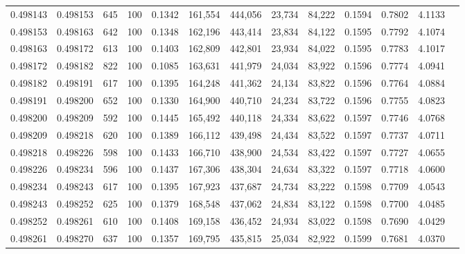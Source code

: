 \begin{tabular}{rrrrrrrrrrrrr}
0.498143 & 0.498153 &   645 & 100 &                                     0.1342 & 161,554 & 444,056 &  23,734 &  84,222 & 0.1594 & 0.7802 & 4.1133 \\
0.498153 & 0.498163 &   642 & 100 &                                     0.1348 & 162,196 & 443,414 &  23,834 &  84,122 & 0.1595 & 0.7792 & 4.1074 \\
0.498163 & 0.498172 &   613 & 100 &                                     0.1403 & 162,809 & 442,801 &  23,934 &  84,022 & 0.1595 & 0.7783 & 4.1017 \\
0.498172 & 0.498182 &   822 & 100 &                                     0.1085 & 163,631 & 441,979 &  24,034 &  83,922 & 0.1596 & 0.7774 & 4.0941 \\
0.498182 & 0.498191 &   617 & 100 &                                     0.1395 & 164,248 & 441,362 &  24,134 &  83,822 & 0.1596 & 0.7764 & 4.0884 \\
0.498191 & 0.498200 &   652 & 100 &                                     0.1330 & 164,900 & 440,710 &  24,234 &  83,722 & 0.1596 & 0.7755 & 4.0823 \\
0.498200 & 0.498209 &   592 & 100 &                                     0.1445 & 165,492 & 440,118 &  24,334 &  83,622 & 0.1597 & 0.7746 & 4.0768 \\
0.498209 & 0.498218 &   620 & 100 &                                     0.1389 & 166,112 & 439,498 &  24,434 &  83,522 & 0.1597 & 0.7737 & 4.0711 \\
0.498218 & 0.498226 &   598 & 100 &                                     0.1433 & 166,710 & 438,900 &  24,534 &  83,422 & 0.1597 & 0.7727 & 4.0655 \\
0.498226 & 0.498234 &   596 & 100 &                                     0.1437 & 167,306 & 438,304 &  24,634 &  83,322 & 0.1597 & 0.7718 & 4.0600 \\
0.498234 & 0.498243 &   617 & 100 &                                     0.1395 & 167,923 & 437,687 &  24,734 &  83,222 & 0.1598 & 0.7709 & 4.0543 \\
0.498243 & 0.498252 &   625 & 100 &                                     0.1379 & 168,548 & 437,062 &  24,834 &  83,122 & 0.1598 & 0.7700 & 4.0485 \\
0.498252 & 0.498261 &   610 & 100 &                                     0.1408 & 169,158 & 436,452 &  24,934 &  83,022 & 0.1598 & 0.7690 & 4.0429 \\
0.498261 & 0.498270 &   637 & 100 &                                     0.1357 & 169,795 & 435,815 &  25,034 &  82,922 & 0.1599 & 0.7681 & 4.0370 \\

\end{tabular}
